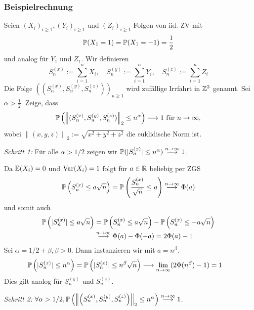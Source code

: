 \subsubsection*{Beispielrechnung}

Seien $(X_i)_{i \geq 1}, (Y_i)_{i \geq 1}$ und $(Z_i)_{i \geq 1}$ Folgen von iid. ZV mit
$$\P(X_1 = 1) = \P(X_1 = -1) = \frac{1}{2}$$
und analog für $Y_1$ und $Z_1$. Wir definieren
$$S_n^{(x)} := \sum_{i=1}^n X_i, \quad S_n^{(y)} := \sum_{i=1}^n Y_i, \quad S_n^{(z)} := \sum_{i=1}^n Z_i$$
Die Folge $\left((S_n^{(x)}, S_n^{(y)}, S_n^{(z)})\right)_{n \geq 1}$ wird zufällige Irrfahrt in $\Z^3$ genannt. Sei $\alpha > \frac{1}{2}$. Zeige, dass
$$\P\left(\left\lVert(S_n^{(x)}, S_n^{(y)}, S_n^{(z)})\right\rVert_2 \leq n^\alpha\right) \longrightarrow 1 \text{ für } n \to \infty,$$
wobei $\left\lVert(x,y,z)\right\rVert_2 := \sqrt{x^2+y^2+z^2}$ die euklidische Norm ist.

\textit{Schritt 1: } Für alle $\alpha > 1/2$ zeigen wir $\P(|S_n^{(x)}| \leq n^\alpha) \overset{n \to \infty}{\longrightarrow} 1$.

Da $\E(X_i) = 0$ und $\Var(X_i) = 1$ folgt für $a \in \R$ beliebig per ZGS
$$\P\left(S_n^{(x)} \leq a \sqrt{n}\right) = \P\left(\frac{S_n^{(x)}}{\sqrt{n}} \leq a\right) \overset{n \to \infty}{\longrightarrow} \Phi(a)$$
und somit auch
\begin{align*}
    \P\left(|S_n^{(x)}| \leq a\sqrt{n}\right) &= \P\left(S_n^{(x)} \leq a \sqrt{n}\right) -\P\left(S_n^{(x)} \leq - a \sqrt{n}\right) \\
    &\overset{n \to \infty}{\longrightarrow} \Phi(a) - \Phi(-a) = 2\Phi(a)-1
\end{align*}
Sei $\alpha = 1/2 + \beta, \beta > 0$. Dann instanzieren wir mit $a = n^\beta$.
\begin{align*}
    \P\left(|S_n^{(x)}| \leq n^\alpha\right) &= \P\left(|S_n^{(x)}| \leq n^\beta\sqrt{n}\right) \longrightarrow \limn(2 \Phi(n^\beta)-1) = 1
\end{align*}
Dies gilt analog für $S_n^{(y)}$ und $S_n^{(z)}$.

\textit{Schritt 2:} $\forall \alpha > 1/2, \P\left(\left\lVert\left(S_n^{(x)}, S_n^{(y)}, S_n^{(z)}\right)\right\rVert_2 \leq n^\alpha\right) \overset{n \to \infty}{\longrightarrow} 1$.

